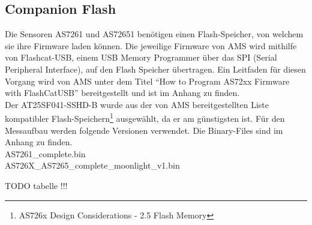 \subsection{Companion Flash}
\label{sec_Companion_Flash}
Die Sensoren AS7261 und AS72651 benötigen einen Flash-Speicher, von welchem sie ihre Firmware laden können.
Die jeweilige Firmware von AMS wird mithilfe von Flashcat-USB, einem USB Memory Programmer über das SPI (Serial Peripheral Interface), auf den Flash Speicher übertragen.
Ein Leitfaden für diesen Vorgang wird von AMS unter dem Titel ``How to Program AS72xx Firmware with FlashCatUSB'' bereitgestellt und ist im Anhang zu finden.\\
Der AT25SF041-SSHD-B wurde aus der von AMS bereitgestellten Liste kompatibler Flash-Speichern\footnote{AS726x Design Considerations - 2.5 Flash Memory} ausgewählt, da er am günstigsten ist. 
Für den Messaufbau werden folgende Versionen verwendet. Die Binary-Files  sind im Anhang zu finden.\\
AS7261\_complete.bin \\
AS726X\_AS7265\_complete\_moonlight\_v1.bin

TODO tabelle !!!



